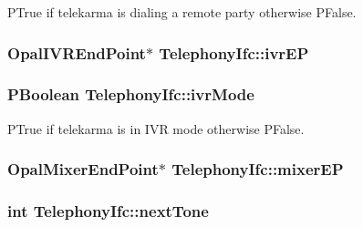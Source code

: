 PTrue if telekarma is dialing a remote party otherwise PFalse. 

\hypertarget{classTelephonyIfc_022bae204ef5d791f5ea8184a1928fb9}{
\subsubsection[{ivrEP}]{\setlength{\rightskip}{0pt plus 5cm}OpalIVREndPoint$\ast$ {\bf TelephonyIfc::ivrEP}}}
\label{classTelephonyIfc_022bae204ef5d791f5ea8184a1928fb9}


\hypertarget{classTelephonyIfc_377903745950f7376b919c2a4456debd}{
\subsubsection[{ivrMode}]{\setlength{\rightskip}{0pt plus 5cm}PBoolean {\bf TelephonyIfc::ivrMode}}}
\label{classTelephonyIfc_377903745950f7376b919c2a4456debd}


PTrue if telekarma is in IVR mode otherwise PFalse. 

\hypertarget{classTelephonyIfc_f15ba6ddee44e5a1908044ba8a83eaa3}{
\subsubsection[{mixerEP}]{\setlength{\rightskip}{0pt plus 5cm}OpalMixerEndPoint$\ast$ {\bf TelephonyIfc::mixerEP}}}
\label{classTelephonyIfc_f15ba6ddee44e5a1908044ba8a83eaa3}


\hypertarget{classTelephonyIfc_b857d1530a322453a8788c9bffbcc833}{
\subsubsection[{nextTone}]{\setlength{\rightskip}{0pt plus 5cm}int {\bf TelephonyIfc::nextTone}}}
\label{classTelephonyIfc_b857d1530a322453a8788c9bffbcc833}


